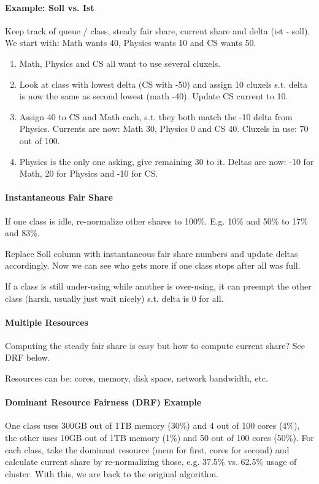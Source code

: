 \paragraph{Example: Soll vs. Ist}
Keep track of queue / class, steady fair share, current share and delta (ist - soll). We start with: Math wants 40, Physics wants 10 and CS wants 50.
\begin{enumerate}
    \item Math, Physics and CS all want to use several cluxels.
    \item Look at class with lowest delta (CS with -50) and assign 10 cluxels s.t. delta is now the same as second lowest (math -40). Update CS current to 10.
    \item Assign 40 to CS and Math each, s.t. they both match the -10 delta from Physics. Currents are now: Math 30, Physics 0 and CS 40. Cluxels in use: 70 out of 100.
    \item Physics is the only one asking, give remaining 30 to it. Deltas are now: -10 for Math, 20 for Physics and -10 for CS.
\end{enumerate}

\paragraph{Instantaneous Fair Share}
If one class is idle, re-normalize other shares to 100\%. E.g. 10\% and 50\% to 17\% and 83\%.

Replace Soll column with instantaneous fair share numbers and update deltas accordingly. Now we can see who gets more if one class stops after all was full.

If a class is still under-using while another is over-using, it can preempt the other class (harsh, usually just wait nicely) s.t. delta is 0 for all.

\paragraph{Multiple Resources}
Computing the steady fair share is easy but how to compute current share? See DRF below.

Resources can be: cores, memory, disk space, network bandwidth, etc.

\paragraph{Dominant Resource Fairness (DRF) Example}
One class uses 300GB out of 1TB memory (30\%) and 4 out of 100 cores (4\%), the other uses 10GB out of 1TB memory (1\%) and 50 out of 100 cores (50\%). For each class, take the dominant resource (mem for first, cores for second) and calculate current share by re-normalizing those, e.g. 37.5\% vs. 62.5\% usage of cluster. With this, we are back to the original algorithm. %

